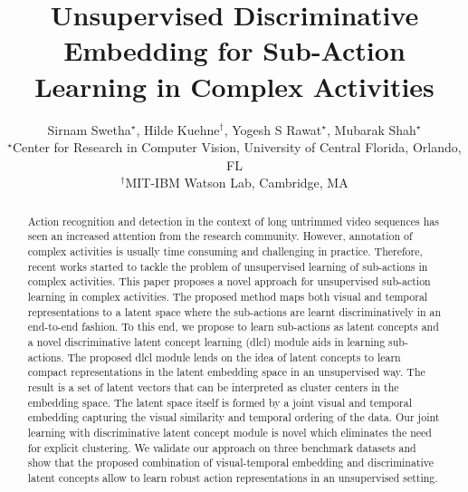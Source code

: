 \documentclass[final]{cvpr}
\begin{document}
\title{Unsupervised Discriminative Embedding for Sub-Action Learning in Complex Activities}

\author{Sirnam Swetha$^{\star}$, Hilde Kuehne$^{\dagger}$, Yogesh S Rawat$^{\star}$, Mubarak Shah$^{\star}$ \\
$^{\star}$Center for Research in Computer Vision, University of Central Florida, Orlando, FL\\
$^{\dagger}$MIT-IBM Watson Lab, Cambridge, MA\\
}

\maketitle

\begin{abstract}


Action recognition and detection in the context of long untrimmed video sequences has seen an increased attention from the research community. 
However, annotation of complex activities is usually time consuming and challenging in practice.
Therefore, recent works started to tackle the problem of unsupervised learning of sub-actions in complex activities.
This paper proposes a novel approach for unsupervised sub-action learning in complex activities.
The proposed method maps both visual and temporal representations to a latent space where the sub-actions are learnt discriminatively in an end-to-end fashion. 
To this end, we propose to learn sub-actions as latent concepts and a novel discriminative latent concept learning {\sc (dlcl)} module aids in learning sub-actions.
The proposed {\sc dlcl} module lends on the idea of latent concepts to learn compact representations in the latent embedding space in an unsupervised way. 
%
The result is a set of latent vectors that can be interpreted as cluster centers in the embedding space.
%
The latent space itself is formed by a joint visual and temporal embedding capturing the visual similarity and temporal ordering of the data. 
%
Our joint learning with discriminative latent concept module is novel which eliminates the need for explicit clustering.
We validate our approach on three benchmark datasets and show that the proposed combination of visual-temporal embedding and discriminative latent concepts allow to learn robust action representations in an unsupervised setting.


\end{abstract}
\end{document}

